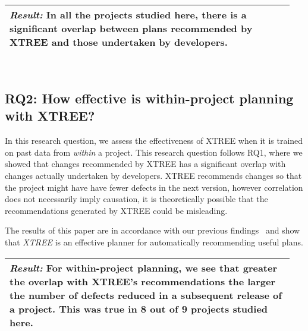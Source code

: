 \documentclass[10pt,journal,compsoc]{IEEEtran}
\begin{document}
\noindent\begin{minipage}{\linewidth}
	\begin{tabular}{|p{0.95\linewidth}|}
		\arrayrulecolor{Gray}
		\hline\vspace{-0.2cm}
		\cellcolor{Gray}\textit{\textbf{Result:}} In all the projects studied here, 
		there is a significant overlap between plans recommended by XTREE and those 
		undertaken by developers.\\\hline
	\end{tabular}
\end{minipage}\bigstrut\\[-.4cm]


\subsection*{RQ2: How effective is within-project planning with XTREE?}

In this research question, we assess the effectiveness of XTREE when it is trained on past data from \textit{within} a project. This research question follows RQ1, where we showed that changes recommended by XTREE has a significant overlap with changes actually undertaken by developers. XTREE recommends changes so that the project might have have fewer defects in the next version, however correlation does not necessarily imply causation, it is theoretically possible that the recommendations generated by XTREE could be misleading. 

The  results of this paper are in accordance with our previous 
findings~\cite{krishna17a} and show that {\em XTREE} is an effective planner 
for automatically recommending useful plans.\\[-0.1cm]


\noindent\begin{minipage}{\linewidth}
	\begin{tabular}{|p{0.95\linewidth}|}
		\arrayrulecolor{Gray}
		\hline\vspace{-0.2cm}
		\cellcolor{Gray}\textit{\textbf{Result:}} For within-project planning, we see 
		that greater the overlap with XTREE's recommendations the larger the number 
		of defects reduced in a subsequent release of a project. This was true in 8 
		out of 9 projects studied here.\\\hline
	\end{tabular}
\end{minipage}\bigstrut\\[-.4cm]
\end{document}
